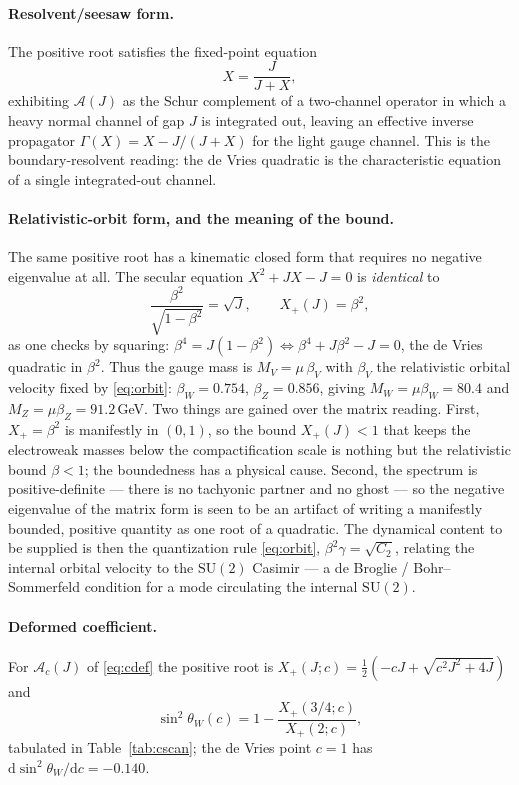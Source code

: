 \documentclass[11pt]{article}
\theoremstyle{plain}
\theoremstyle{definition}
\newcommand{\cA}{\mathcal{A}}
\newcommand{\Xp}{X_{+}}
\newcommand{\dd}{\mathrm{d}}
\newcommand{\SU}{\mathrm{SU}}
\begin{document}
\paragraph{Resolvent/seesaw form.} The positive root satisfies the fixed-point
equation
\begin{equation}
X=\frac{J}{J+X},
\end{equation}
exhibiting $\cA(J)$ as the Schur complement of a two-channel operator in
which a heavy normal channel of gap $J$ is integrated out, leaving an
effective inverse propagator $\Gamma(X)=X-J/(J+X)$ for the light gauge
channel. This is the boundary-resolvent reading: the de Vries quadratic is
the characteristic equation of a single integrated-out channel.

\paragraph{Relativistic-orbit form, and the meaning of the bound.} The same
positive root has a kinematic closed form that requires no negative
eigenvalue at all. The secular equation $X^2+JX-J=0$ is \emph{identical} to
\begin{equation}
\frac{\beta^2}{\sqrt{1-\beta^2}}=\sqrt J,\qquad X_+(J)=\beta^2,
\label{eq:orbit}
\end{equation}
as one checks by squaring: $\beta^4=J(1-\beta^2)\Leftrightarrow
\beta^4+J\beta^2-J=0$, the de Vries quadratic in $\beta^2$. Thus the gauge
mass is $M_V=\mu\,\beta_V$ with $\beta_V$ the relativistic orbital velocity
fixed by \eqref{eq:orbit}: $\beta_W=0.754$, $\beta_Z=0.856$, giving
$M_W=\mu\beta_W=80.4$ and $M_Z=\mu\beta_Z=91.2\,$GeV. Two things are gained
over the matrix reading. First, $X_+=\beta^2$ is manifestly in $(0,1)$, so the
bound $\Xp(J)<1$ that keeps the electroweak masses below the compactification
scale is nothing but the relativistic bound $\beta<1$; the boundedness has a
physical cause. Second, the spectrum is positive-definite --- there is no
tachyonic partner and no ghost --- so the negative eigenvalue of the matrix
form is seen to be an artifact of writing a manifestly bounded, positive
quantity as one root of a quadratic. The dynamical content to be supplied is
then the quantization rule \eqref{eq:orbit}, $\beta^2\gamma=\sqrt{C_2}$,
relating the internal orbital velocity to the $\SU(2)$ Casimir --- a
de Broglie / Bohr--Sommerfeld condition for a mode circulating the internal
$\SU(2)$.

\paragraph{Deformed coefficient.} For $\cA_c(J)$ of \eqref{eq:cdef} the
positive root is $\Xp(J;c)=\tfrac12(-cJ+\sqrt{c^2J^2+4J})$ and
\begin{equation}
\sin^2\theta_W(c)=1-\frac{\Xp(3/4;c)}{\Xp(2;c)},
\end{equation}
tabulated in Table~\ref{tab:cscan}; the de Vries point $c=1$ has
$\dd\sin^2\theta_W/\dd c=-0.140$.
\end{document}
